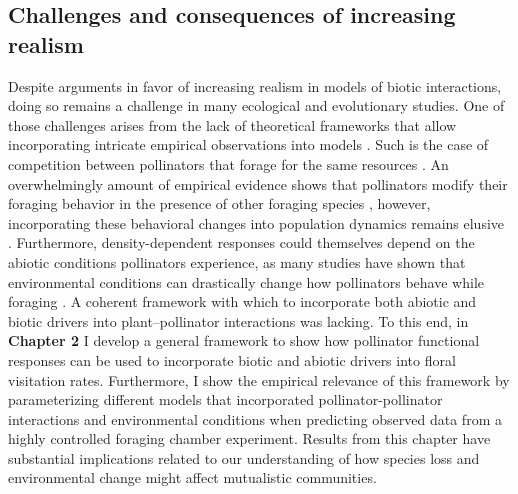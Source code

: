 \documentclass[12pt]{article}
\begin{document}
\subsection*{Challenges and consequences of increasing realism}

Despite arguments in favor of increasing realism in models of biotic interactions, doing so remains a challenge in many ecological and evolutionary studies. One of those challenges arises from the lack of theoretical frameworks that allow incorporating intricate empirical observations into models \citep{abrams1983arguments}.  Such is the case of competition between pollinators that forage for the same resources \citep{thomson_importance_2020}. An overwhelmingly amount of empirical evidence shows that pollinators modify their foraging behavior in the presence of other foraging species \citep{morse_resource_1977,inouye_resource_1978,thompson_dynamics_2006,brosi_single_2013,briggs_competitive_2016}, however, incorporating these behavioral changes into population dynamics remains elusive \citep{thomson_importance_2020}. Furthermore, density-dependent responses could themselves depend on the abiotic conditions pollinators experience, as many studies have shown that environmental conditions can drastically change how pollinators behave while foraging \citep{heinrich_resource_1976,thomson_response_1987,cnaani_flower_2006,westphal_bumblebees_2006,briggs2018variation,classen2020specialization}. A coherent framework with which to incorporate both abiotic and biotic drivers into plant--pollinator interactions was lacking. To this end, in \textbf{Chapter 2} I develop a general framework to show how pollinator functional responses can be used to incorporate biotic and abiotic drivers into floral visitation rates. Furthermore, I show the empirical relevance of this framework by parameterizing different models that incorporated pollinator-pollinator interactions and environmental conditions when predicting observed data from a highly controlled foraging chamber experiment. Results from this chapter have substantial implications related to our understanding of how species loss and environmental change might affect mutualistic communities.
\end{document}

